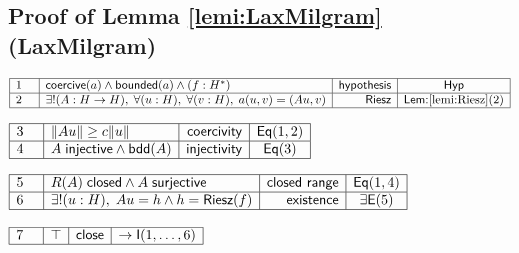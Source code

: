\documentclass[11pt,reqno]{amsart}
\begin{document}
	\subsection*{Proof of Lemma \protect\ref{lemi:LaxMilgram} (\textsf{LaxMilgram})}
	\noindent$\begin{array}{|m{0.5cm}|l|r|c|}
	\hline
	1 & \mathsf{coercive}(a)\wedge\mathsf{bounded}(a)\wedge(f:H^{*}) & \mathsf{hypothesis} & \mathsf{Hyp} \\ \hline
	2 & \exists! (A:H\to H),\;\forall (u:H),\;\forall (v:H),\;a(u,v)=(Au,v) & \mathsf{Riesz} & \textsf{Lem:}\ref{lemi:Riesz}(2) \\ \hline
	\end{array}$
	\par\nointerlineskip\noindent$\begin{array}{|m{0.5cm}|l|r|c|}
	\hline
	3 & \|Au\|\ge c\|u\| & \mathsf{coercivity} & \mathsf{Eq}(1,2) \\ \hline
	4 & A\;\mathsf{injective}\wedge\mathsf{bdd}(A) & \mathsf{injectivity} & \mathsf{Eq}(3) \\ \hline
	\end{array}$
	\par\nointerlineskip\noindent$\begin{array}{|m{0.5cm}|l|r|c|}
	\hline
	5 & R(A)\;\mathsf{closed}\wedge A\;\mathsf{surjective} & \mathsf{closed\ range} & \mathsf{Eq}(1,4) \\ \hline
	6 & \exists! (u:H),\;Au=h\wedge h=\mathsf{Riesz}(f) & \mathsf{existence} & \exists\mathsf{E}(5) \\ \hline
	\end{array}$
	\par\nointerlineskip\noindent$\begin{array}{|m{0.5cm}|l|r|c|}
	\hline
	7 & \top & \mathsf{close} & \to\mathsf{I}(1,\dots,6) \\ \hline
	\end{array}$
	\medskip
	
\end{document}
